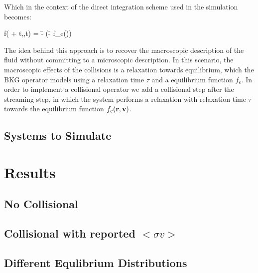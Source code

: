 Which in the context of the direct integration scheme used in the simulation becomes:
\begin{myequation}
f( +  \dd t,,t) = \f - (\f - f_e(\rv))
\end{myequation}

The idea behind this approach is to recover the macroscopic description of the fluid without committing to a microscopic description. In this scenario, the macroscopic effects of the collisions is a relaxation towards equilibrium, which the BKG operator models using a relaxation time $\tau$ and a equilibrium function $f_e$. In order to implement a collisional operator we add a collisional step after the streaming step, in which the system performs a relaxation with relaxation time $\tau$ towards the equilibrium function $f_e(\rv)$.\\



\section{Systems to Simulate}

















\chapter{Results}
\section{No Collisional}
\section{Collisional with reported $<\sigma v>$}
\section{Different Equlibrium Distributions}